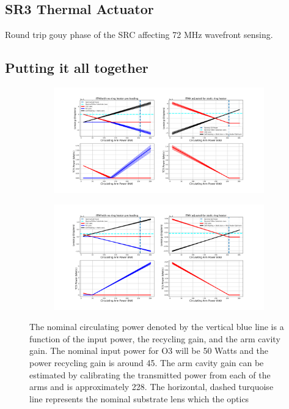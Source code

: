 	\cite{hello_vinet}
	
	
	\subsection{SR3 Thermal Actuator}
	Round trip gouy phase of the SRC affecting 72 MHz wavefront sensing.
	
	\subsection{Putting it all together}
	
	\begin{figure}[ht]
		\centering
		\begin{subfigure}[b]{1.0\textwidth}
			\centering
			\includegraphics[width=\textwidth]{../Figures/ITMX_TCS_Settings.png}
			\label{fig:TCS_ITMX}
		\end{subfigure}
		\hfill
		\begin{subfigure}[b]{1.0\textwidth}
			\centering
			\includegraphics[width=\textwidth]{../Figures/ITMY_TCS_Settings.png}
			\label{fig:TCS_ITMY}
		\end{subfigure}
		\caption{The nominal circulating power denoted by the vertical blue line is a function of the input power, the recycling gain, and the arm cavity gain.  The nominal input power for O3 will be 50 Watts and the power recycling gain is around 45.  The arm cavity gain can be estimated by calibrating the transmitted power from each of the arms and is approximately 228.  The horizontal, dashed turquoise line represents the nominal substrate lens which the optics  }
		\label{fig:TCS_ITMs}
	\end{figure}
	
